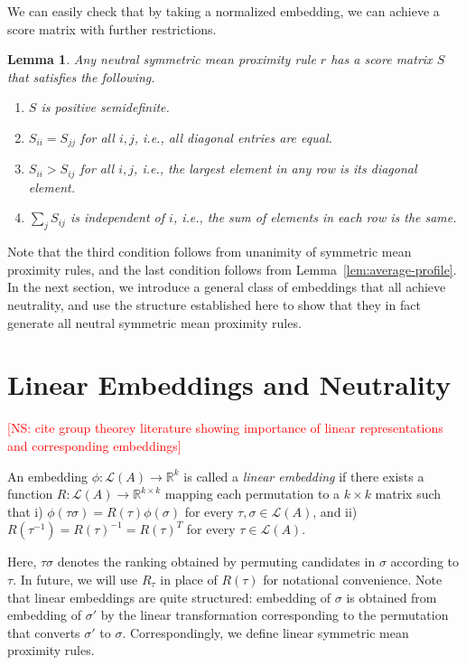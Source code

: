 \documentclass[10pt,letterpaper]{article}
\newcommand{\calL}{{\mathcal{L}}}
\newcommand{\rank}{{\calL(A)}}
\newtheorem{lemma}{Lemma}
\newenvironment{definition}[1][Definition]{\begin{trivlist}
\item[\hskip \labelsep {\bfseries #1}]}{\end{trivlist}}
\newcommand{\kibitz}[2]{\ifnum\Comments=1\textcolor{#1}{#2}\fi}
\newcommand{\cns}[1]{\kibitz{red} {[NS: #1]}}
\begin{document}
We can easily check that by taking a normalized embedding, we can achieve a score matrix with further restrictions.
\begin{lemma}
Any neutral symmetric mean proximity rule $r$ has a score matrix $S$ that satisfies the following.
\begin{enumerate}
\item $S$ is positive semidefinite.
\item $S_{ii} = S_{jj}$ for all $i,j$, i.e., all diagonal entries are equal.
\item $S_{ii} > S_{ij}$ for all $i,j$, i.e., the largest element in any row is its diagonal element.
\item $\sum_j S_{ij}$ is independent of $i$, i.e., the sum of elements in each row is the same.
\end{enumerate}
\label{lem:neutral-mean-proximity-properties}
\end{lemma}
Note that the third condition follows from unanimity of symmetric mean proximity rules, and the last condition follows from Lemma~\ref{lem:average-profile}. In the next section, we introduce a general class of embeddings that all achieve neutrality, and use the structure established here to show that they in fact generate all neutral symmetric mean proximity rules.


\section{Linear Embeddings and Neutrality}

\cns{cite group theorey literature showing importance of linear representations and corresponding embeddings}

\begin{definition}[Linear Embeddings]
An embedding $\phi:\rank \rightarrow \mathbb{R}^k$ is called a \emph{linear embedding} if there exists a function $R : \rank \rightarrow \mathbb{R}^{k \times k}$ mapping each permutation to a $k \times k$ matrix such that i) $\phi(\tau \sigma) = R(\tau) \phi(\sigma)$ for every $\tau,\sigma \in \rank$, and ii) $R(\tau^{-1}) = R(\tau)^{-1} = R(\tau)^T$ for every $\tau \in \rank$. 
\end{definition}

Here, $\tau \sigma$ denotes the ranking obtained by permuting candidates in $\sigma$ according to $\tau$. In future, we will use $R_{\tau}$ in place of $R(\tau)$ for notational convenience. Note that linear embeddings are quite structured: embedding of $\sigma$ is obtained from embedding of $\sigma'$ by the linear transformation corresponding to the permutation that converts $\sigma'$ to $\sigma$. Correspondingly, we define linear symmetric mean proximity rules.
\end{document}
